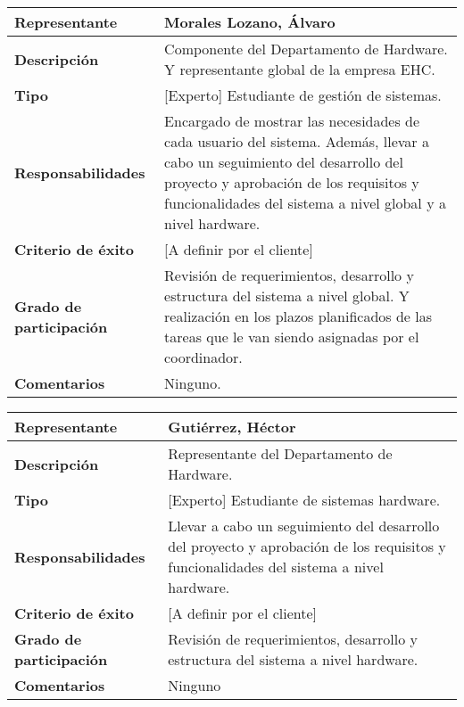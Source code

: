         \begin{tabular}{|p{4cm}|p{12cm}|}
            \hline \textbf{Representante} & Morales Lozano, Álvaro \\
            \hline \textbf{Descripción} &  Componente del Departamento de Hardware. Y representante global de la empresa EHC. \\
            \hline \textbf{Tipo} &  [Experto] Estudiante de gestión de sistemas.\\
            \hline \textbf{Responsabilidades} &  Encargado de mostrar las necesidades de cada usuario del sistema. Además, llevar a cabo un seguimiento del desarrollo del proyecto y aprobación de  los requisitos y funcionalidades del sistema a nivel global y a nivel hardware.\\
            \hline \textbf{Criterio de éxito} &  [A definir por el cliente]\\
            \hline \textbf{Grado de participación} &  Revisión de requerimientos, desarrollo y estructura del sistema a nivel global. Y realización en los plazos planificados de las tareas que le van siendo asignadas por el coordinador.\\
            \hline \textbf{Comentarios} &  Ninguno.\\
            \hline
        \end{tabular}

        \begin{tabular}{|p{4cm}|p{12cm}|}
            \hline \textbf{Representante} &  Gutiérrez, Héctor\\
            \hline \textbf{Descripción} &  Representante del Departamento de Hardware. \\
            \hline \textbf{Tipo} &  [Experto] Estudiante de sistemas hardware.\\
            \hline \textbf{Responsabilidades} &  Llevar a cabo un seguimiento del desarrollo del proyecto y aprobación de  los requisitos y funcionalidades del sistema a nivel hardware. \\
            \hline \textbf{Criterio de éxito} &  [A definir por el cliente]\\
            \hline \textbf{Grado de participación} &  Revisión de requerimientos, desarrollo y estructura del sistema a nivel hardware.\\
            \hline \textbf{Comentarios} &  Ninguno\\
            \hline
        \end{tabular}
        
